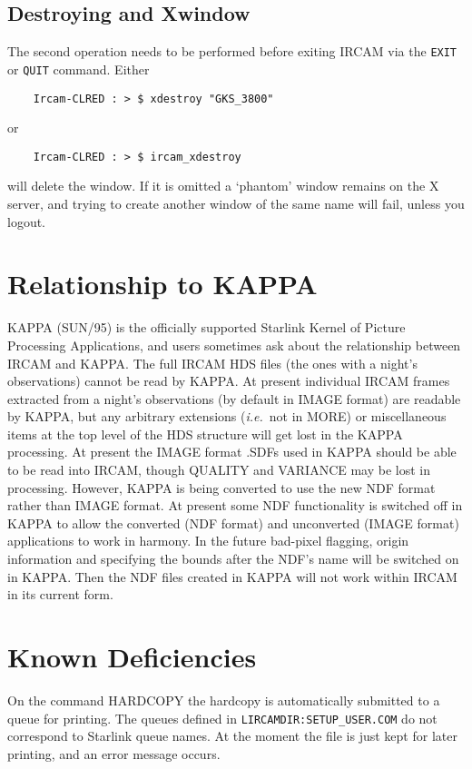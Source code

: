 \subsection{Destroying and Xwindow}

The second operation needs to be performed before exiting IRCAM
via the {\tt EXIT} or {\tt QUIT} command. Either
\begin{verbatim}
    Ircam-CLRED : > $ xdestroy "GKS_3800"
\end{verbatim}
or
\begin{verbatim}
    Ircam-CLRED : > $ ircam_xdestroy
\end{verbatim}
will delete the window.  If it is omitted a `phantom' window remains
on the X server, and trying to create another window of the same name
will fail, unless you logout.

\section {Relationship to KAPPA}
KAPPA (SUN/95) is the officially supported Starlink Kernel of Picture
Processing Applications, and users sometimes ask about the relationship
between IRCAM and KAPPA. The full IRCAM HDS files (the ones with a
night's observations) cannot be read by KAPPA. At present individual
IRCAM frames extracted from a night's observations (by default in IMAGE
format) are readable by KAPPA, but any arbitrary extensions ({\it i.e.}\
not in MORE) or miscellaneous items at the top level of the HDS
structure will get lost in the KAPPA processing.  At present the IMAGE
format .SDFs used in KAPPA should be able to be read into IRCAM, though
QUALITY and VARIANCE may be lost in processing. However, KAPPA is being
converted to use the new NDF format rather than IMAGE format. At present
some NDF functionality is switched off in KAPPA to allow the converted
(NDF format) and unconverted (IMAGE format) applications to work in
harmony. In the future bad-pixel flagging, origin information and
specifying the bounds after the NDF's name will be switched on in KAPPA.
Then the NDF files created in KAPPA will not work within IRCAM in its
current form.

\section {Known Deficiencies}
On the command HARDCOPY the hardcopy is automatically submitted to a
queue for printing. The queues defined in {\tt LIRCAMDIR:SETUP\_USER.COM}
do not correspond to Starlink queue names. At the moment the file is
just kept for later printing, and an error message occurs. 

